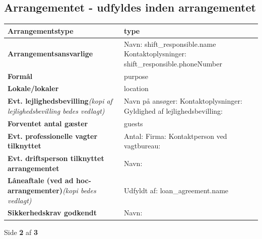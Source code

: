 \documentclass[a4paper, 11pt]{article}
\newcommand{\loglabel}[2][0.5cm]{\textbf{#2}\vspace{#1}}
\newcommand{\loglabelextended}[3][0.5cm]{\textbf{#2}\newline \textit{#3}\vspace{#1}}
\begin{document}
{{{{{\subsection*{Arrangementet - udfyldes inden arrangementet}

\begin{tabularx}{\textwidth}{|X|X|}
    \hline
    \loglabel{Arrangementstype} & {{ type }} \\ \hline
    \loglabel{Arrangementsansvarlige} &
        Navn: {{ shift_responsible.name }} \newline
        Kontaktoplysninger: {{ shift_responsible.phoneNumber }} \\ \hline
    \loglabel{Formål} & {{ purpose }} \\ \hline
    \loglabel{Lokale/lokaler} & {{ location }} \\ \hline
    \loglabelextended{Evt. lejlighedsbevilling}{(kopi af lejlighedsbevilling bedes vedlagt)} &
        Navn på ansøger: \newline
        Kontaktoplysninger: \vspace{0.5cm} \noindent \newline
        Gyldighed af lejlighedsbevilling: \vspace{1cm} \\ \hline
    \loglabel{Forventet antal gæster} & {{ guests }} \\ \hline
    \loglabel{Evt. professionelle vagter tilknyttet} &
        Antal: \newline
        Firma: \newline
        Kontaktperson ved vagtbureau: \\ \hline
    \loglabel[1cm]{Evt. driftsperson tilknyttet arrangementet} &
        Navn: \\ \hline
    \loglabelextended[1cm]{Låneaftale (ved ad hoc-arrangementer)}{(kopi bedes vedlagt)} &
        Udfyldt af: {{ loan_agreement.name }} \\ \hline
    \loglabel[1cm]{Sikkerhedskrav godkendt} &
        Navn: \\ \hline
\end{tabularx}

\vfill

\begin{center}
    Side \textbf{2} af \textbf{3}
\end{center}

\newpage

{%

}}}}}}
\end{document}
